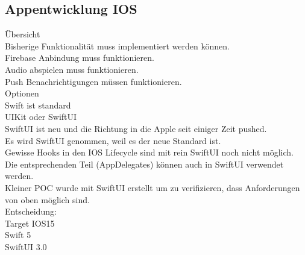 
\subsection{Appentwicklung IOS}

Übersicht \\

Bisherige Funktionalität muss implementiert werden können. \\
Firebase Anbindung muss funktionieren. \\
Audio abspielen muss funktionieren. \\
Push Benachrichtigungen müssen funktionieren. \\

Optionen \\

Swift ist standard \\
UIKit oder SwiftUI \\

SwiftUI ist neu und die Richtung in die Apple seit einiger Zeit pushed. \\
Es wird SwiftUI genommen, weil es der neue Standard ist. \\
Gewisse Hooks in den IOS Lifecycle sind mit rein SwiftUI noch nicht möglich. \\
Die entsprechenden Teil (AppDelegates) können auch in SwiftUI verwendet werden. \\

Kleiner POC wurde mit SwiftUI erstellt um zu verifizieren, dass Anforderungen von oben möglich sind. \\

Entscheidung: \\

Target IOS15 \\
Swift 5 \\
SwiftUI 3.0 \\

\clearpage
